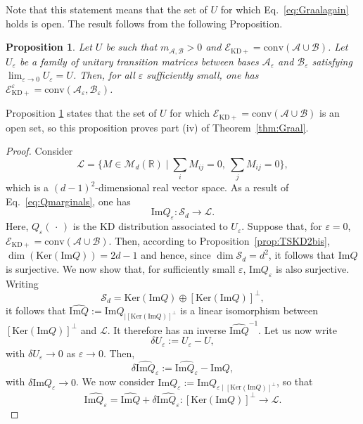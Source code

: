 \documentclass[a4paper, notitlepage, 11pt]{article}
\numberwithin{equation}{section}
\newcommand{\Acal}{{\mathcal A}}
\newcommand{\Bcal}{{\mathcal B}}
\newcommand{\EcalKDC}{{\mathcal E}_{\mathrm{KD+}}}
\newcommand{\Ker}{{\mathrm{Ker}}}
\newcommand{\R}{\mathbb{R}}
\newcommand{\mab}{m_{\Acal,\Bcal}}
\newcommand{\conv}[1]{\mathrm{conv}\left(#1\right)}
\renewcommand{\Im}[1]{\mathrm{Im}#1}
\newcommand{\SAO}{\mathcal{S}_{d}}
\newcommand{\convAB}{\conv{\Acal \cup \Bcal}}
\renewcommand{\epsilon}{\varepsilon}
\newtheorem{Prop}[Theorem]{Proposition}
\begin{document}
Note that this statement means that the set of $U$ for which Eq.~\eqref{eq:Graalagain} holds is open. The result follows from the following Proposition.
\begin{Prop}\label{prop:stability1} Let $U$ be such that $\mab>0$ and $\EcalKDC=\convAB$. Let $U_\epsilon$ be a family of unitary transition matrices between bases $\Acal_\epsilon$ and $\Bcal_\epsilon$ satisfying $\lim_{\epsilon\to 0}U_\epsilon=U$. Then, for all $\epsilon$ sufficiently small, one has
$\EcalKDC^\epsilon=\conv{\Acal_\epsilon,\Bcal_\epsilon}$. 
\end{Prop}
Proposition \ref{prop:stability1} states that the set of $U$ for which  $\EcalKDC=\convAB$ is an open set, so this proposition proves part (iv) of Theorem~\ref{thm:Graal}.
\begin{proof} Consider 
$$
\mathcal L=\{M\in\mathcal{M}_d(\R)\mid \sum_i M_{ij}=0,\ \sum_j M_{ij}=0\},
$$
which is  a $(d-1)^2$-dimensional real vector space. As a result of Eq.~\eqref{eq:Qmarginals}, one has
$$
\mathrm{Im}Q_\epsilon :\SAO\to \mathcal L.
$$
Here, $Q_\epsilon(\, \cdot \, )$ is the KD distribution associated to $U_\epsilon$. Suppose that, for $\epsilon=0$, $\EcalKDC=\convAB$. 
Then, according to Proposition~\ref{prop:TSKD2bis}, $\dim(\Ker{(\mathrm{Im} Q)}  )=2d-1$ and hence, since $\dim \SAO=d^2$, it follows that $\Im Q$ is surjective. We now show that, for sufficiently small $\epsilon$, $\Im Q_{\epsilon}$ is also surjective. Writing 
$$
\SAO= \Ker(\mathrm{Im} Q)\oplus [\Ker(\mathrm{Im} Q)]^\perp,
$$
it follows that $\widehat{\mathrm{Im} Q}:= \mathrm{Im}Q_{\mid [\Ker(\mathrm{Im} Q)]^\perp}$  is a linear isomorphism between $ [\Ker(\mathrm{Im} Q)]^\perp$ and $\mathcal L$. It therefore has an inverse $\widehat{\mathrm{Im} Q}^{-1}$.  Let us now write 
$$
\delta U_\epsilon:=U_\epsilon -U,
$$
with $\delta U_\epsilon\to0$ as $\epsilon\to0$. Then, 
$$
\widehat{\delta \mathrm{Im} Q_\epsilon}:= \widehat{\mathrm{Im}Q_\epsilon}-\widehat{\mathrm{Im}Q},
$$
with $\delta\mathrm{Im} Q_\epsilon\to0$. %
We now consider $\widehat {\mathrm{Im}Q_\epsilon}:=\mathrm{Im}Q_{\epsilon\mid [\Ker(\mathrm{Im} Q)]^\perp}$, so that
$$
\widehat {\mathrm{Im}Q_\epsilon} =\widehat  {\mathrm{Im} Q}+\delta \widehat{\mathrm{Im}Q_\epsilon} : [\Ker(\mathrm{Im} Q)]^\perp\to \mathcal L.
$$ 

\end{proof}
\end{document}
